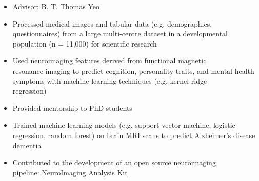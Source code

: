\documentclass[10pt,a4paper,ragged2e,withhyper]{altacv}
\begin{document}
\begin{paracol}{2}
\divider

\begin{itemize}
    \item Advisor: B. T. Thomas Yeo
    \item Processed medical images and tabular data (e.g. demographics, \\questionnaires) from a large multi-centre dataset in a developmental population (n = 11,000) for scientific research
    \item Used neuroimaging features derived from functional magnetic \\resonance imaging to predict cognition, personality traits, and mental health symptoms with machine learning techniques (e.g. kernel ridge \\regression)
    \item Provided mentorship to PhD students
\end{itemize}

\divider

\begin{itemize}
    \item Trained machine learning models (e.g. support vector machine, logistic regression, random forest) on brain MRI scans to predict Alzheimer's disease dementia
    \item Contributed to the development of an open source neuroimaging \\pipeline: \href{https://niak.simexp-lab.org/build/html/index.html}{NeuroImaging Analysis Kit}
\end{itemize}




\end{paracol}
\end{document}
